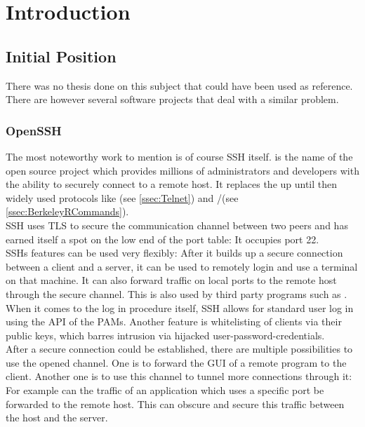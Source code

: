 \documentclass[10pt,a4paper,titlepage,twoside,english,final]{zhawreprt}
\begin{document}
\makedeclarationoforiginality

\tableofcontents

\chapter{Introduction}\label{chp:Introduction}
\section{Initial Position}\label{sec:InitialPosition}
There was no thesis done on this subject that could have been used as reference. There are however several software projects that deal with a similar problem.

\subsection{OpenSSH}\label{ssec:OpenSSH}
The most noteworthy work to mention is of course \gls{SSH} itself. \cite{openssh} is the name of the open source project which provides millions of administrators and developers with the ability to securely connect to a remote host. It replaces the up until then widely used protocols like \cite{telnet}(see \ref{ssec:Telnet}) and \cite{rlogin}/\cite{rsh}(see \ref{ssec:BerkeleyRCommands}).\\
\gls{SSH} uses \gls{TLS} to secure the communication channel between two peers and has earned itself a spot on the low end of the \gls{port} table: It occupies \gls{port} 22.\\
\gls{SSH}s features can be used very flexibly: After it builds up a secure connection between a client and a server, it can be used to remotely login and use a \gls{terminal} on that machine.
It can also forward traffic on local ports to the remote host through the secure channel. This is also used by third party programs such as \cite{rsync}.\\
When it comes to the log in procedure itself, \gls{SSH} allows for standard user log in using the \gls{API} of the \glspl{PAM}. Another feature is whitelisting of clients via their public keys, which barres intrusion via hijacked user-password-credentials.\\
After a secure connection could be established, there are multiple possibilities to use the opened channel. One is to forward the \gls{GUI} of a remote program to the client. Another one is to use this channel to tunnel more connections through it: For example can the traffic of an application which uses a specific \gls{port} be forwarded to the remote host. This can obscure and secure this traffic between the host and the server.
\end{document}
